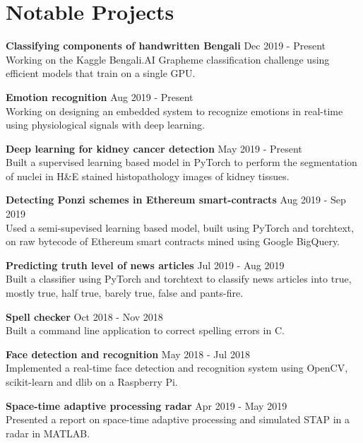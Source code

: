 \documentclass[letterpaper]{article}
\renewenvironment{itemize}{
  \begin{list}{}{
    \setlength{\leftmargin}{1.5em}
  }
}{
  \end{list}
}
\begin{document}
\section*{Notable Projects}
  \begin{itemize}
    \item
    \textbf{Classifying components of handwritten Bengali}
    \hfill{\textcolor{black!80}{\small{Dec 2019 - Present}}}\\
    Working on the Kaggle Bengali.AI Grapheme classification challenge
    using efficient models that train on a single GPU.

    \item
    \textbf{Emotion recognition}
    \hfill{\textcolor{black!80}{\small{Aug 2019 - Present}}}\\
    Working on designing an embedded system to recognize emotions in real-time using physiological signals with deep learning.

    \item
    \textbf{Deep learning for kidney cancer detection}
    \hfill{\textcolor{black!80}{\small{May 2019 - Present}}}\\
    Built a supervised learning based model in PyTorch to perform the segmentation of nuclei in H\&E stained histopathology images of kidney tissues.

    \item
    \textbf{Detecting Ponzi schemes in Ethereum smart-contracts}
    \hfill{\textcolor{black!80}{\small{Aug 2019 - Sep 2019}}}\\
    Used a semi-supevised learning based model, built using PyTorch and torchtext, on raw bytecode of Ethereum smart contracts mined using Google BigQuery.

    \item
    \textbf{Predicting truth level of news articles}
    \hfill{\textcolor{black!80}{\small{Jul 2019 - Aug 2019}}}\\
    Built a classifier using PyTorch and torchtext to classify news articles into true, mostly true, half true, barely true, false and pants-fire.

    \item
    \textbf{Spell checker}
    \hfill{\textcolor{black!80}{\small{Oct 2018 - Nov 2018}}}\\
    Built a command line application to correct spelling errors in C.

    \item
    \textbf{Face detection and recognition}
    \hfill{\textcolor{black!80}{\small{May 2018 - Jul 2018}}}\\
    Implemented a real-time face detection and recognition system using OpenCV, scikit-learn and dlib on a Raspberry Pi.

    \item
    \textbf{Space-time adaptive processing radar}
    \hfill{\textcolor{black!80}{\small{Apr 2019 - May 2019}}}\\
    Presented a report on space-time adaptive processing and simulated STAP in a radar in MATLAB.

  \end{itemize}
\end{document}
